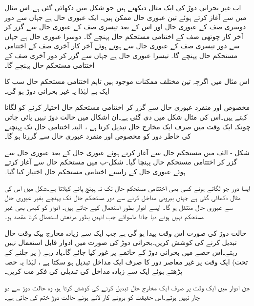 اب غیر بحرانی دوڑ کی ایک مثال دیکھتے ہیں جو شکل  میں دکھائی گئی ہے۔اس مثال میں  سے آغاز کرتے ہوئے تین عبوری حال ممکن ہیں۔ ایک عبوری حال  ہے جہاں سے دور دوسری صف کے عبوری حال  اور اس کے بعد تیسری صف کے عبوری حال  سے گزر کر آخر کار چوتھی صف کے اختتامی مستحکم حال  پہنچے گا۔ دوسرا عبوری حال  ہے جہاں سے دور تیسری صف کے عبوری حال  سے ہوتے ہوئے آخر کار آخری صف کے اختتامی مستحکم حال  پہنچے گا۔ تیسرا عبوری حال  ہے جہاں سے گزر کر دور آخری صف کے اختتامی مستحکم حال  پہنچے گا۔

اس مثال میں اگرچہ تین مختلف ممکنات موجود ہیں تاہم اختتامی مستحکم حال سب کا ایک ہے لہٰذا یہ غیر بحرانی دوڑ ہو گی۔ 

 مخصوص اور منفرد عبوری حال سے گزر کر اختتامی مستحکم حال اختیار کرنے کو  لگانا کہتے ہیں۔اس کی مثال شکل  میں دی گئی ہے۔ان اشکال میں حالت دوڑ نہیں پائی جاتی چونکہ ایک وقت میں صرف ایک مخارج حال تبدیل کرتا ہے ، البتہ اختتامی حال تک پہنچنے کی خاطر دور کو مخصوص اور منفرد عبوری حال سے گزرنا ہو گا۔

شکل - الف میں مستحکم حال  سے آغاز کرتے ہوئے عبوری حال  کے بعد عبوری حال  سے گزر کر اختتامی مستحکم حال  پہنچا گیا۔ شکل-ب میں مستحکم حال  سے آغاز کرتے ہوئے عبوری حال  کے راستے اختتامی مستحکم حال  اختیار کیا گیا۔


 ایسا دور جو  لگاتے ہوئے کسی بھی اختتامی مستحکم حال تک نہ پہنچ پائے  کہلاتا ہے۔شکل  میں اس کی مثال دکھائی گئی ہے جہاں بیرونی مداخل  کرنے سے دور مستحکم حال تک پہنچے بغیر عبوری حال سے عبوری حال منتقل ہو گا۔	ایسے ادوار بطور استعمال کیے جاتے ہیں۔ ادوار کو کبھی بھی غیر مستحکم نہیں ہونے دیا جاتا ماسوائے جب انہیں بطور مرتعش استعمال کرنا مقصد ہو۔

حالت دوڑ کی صورت اس وقت پیدا ہو گی ہے جب ایک سے زیادہ مخارج بیک وقت حال تبدیل کرنے کی کوشش کریں۔بحرانی دوڑ کی صورت میں ادوار قابل استعمال نہیں رہتے۔اس حصے میں بحرانی دوڑ کے خاتمے پر غور کیا جائے گا۔یاد رہے ( پر چلنے کے تحت) ایک وقت پر غیر معاصر دور کا صرف ایک مداخل تبدیل ہو سکتا ہے ، لہٰذا یہ حصہ پڑھتے ہوئے ایک سے زیادہ مداخل کی تبدیلی کی فکر مت کریں۔

جن ادوار میں ایک وقت پر صرف ایک مخارج حال تبدیل کرنے کی کوشش کرتا ہو، وہ حالت دوڑ سے دو چار نہیں ہوتے۔اس حقیقت کو بروئے کار لاتے ہوئے حالت دوڑ ختم کی جاتی ہے۔

